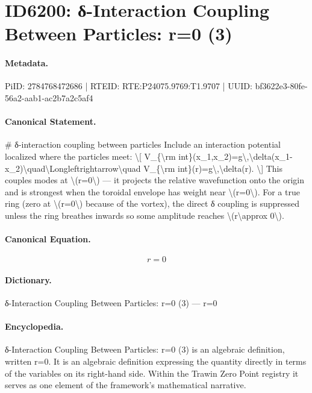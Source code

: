 \section*{ID6200: δ-Interaction Coupling Between Particles: r=0 (3)}
\paragraph{Metadata.}
PiID: 2784768472686 | RTEID: RTE:P24075.9769:T1.9707 | UUID: bf3622e3-80fe-56a2-aab1-ac2b7a2c5af4

\paragraph{Canonical Statement.}
\# δ-interaction coupling between particles Include an interaction potential localized where the particles meet: \textbackslash{}[ V\_\{\textbackslash{}rm int\}(x\_1,x\_2)=g\textbackslash{},\textbackslash{}delta(x\_1-x\_2)\textbackslash{}quad\textbackslash{}Longleftrightarrow\textbackslash{}quad V\_\{\textbackslash{}rm int\}(r)=g\textbackslash{},\textbackslash{}delta(r). \textbackslash{}] This couples modes at \textbackslash{}(r=0\textbackslash{}) — it projects the relative wavefunction onto the origin and is strongest when the toroidal envelope has weight near \textbackslash{}(r=0\textbackslash{}). For a true ring (zero at \textbackslash{}(r=0\textbackslash{}) because of the vortex), the direct δ coupling is suppressed unless the ring breathes inwards so some amplitude reaches \textbackslash{}(r\textbackslash{}approx 0\textbackslash{}).

\paragraph{Canonical Equation.}
\[
r=0
\]

\paragraph{Dictionary.}
δ-Interaction Coupling Between Particles: r=0 (3) — r=0

\paragraph{Encyclopedia.}
δ-Interaction Coupling Between Particles: r=0 (3) is an algebraic definition, written r=0. It is an algebraic definition expressing the quantity directly in terms of the variables on its right-hand side. Within the Trawin Zero Point registry it serves as one element of the framework's mathematical narrative.
